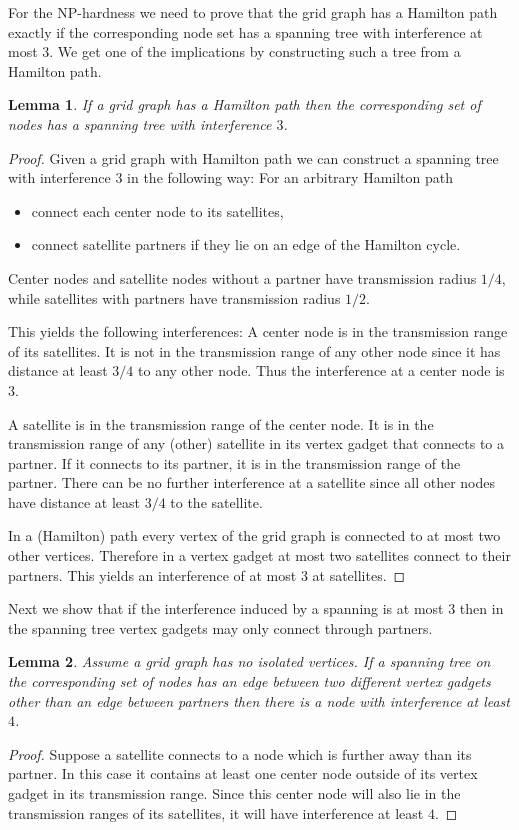 \documentclass{article}
\theoremstyle{plain}
\newtheorem{lem}{Lemma}
\theoremstyle{definition}
\theoremstyle{remark}
\begin{document}
For the NP-hardness we need to prove that the grid graph has a Hamilton path exactly if
the corresponding node set has a spanning tree with interference at most $3$.
We get one of the implications by constructing such a tree from a Hamilton path.

\begin{lem}\label{lem:HPtoST}
If a grid graph has a Hamilton path then the corresponding set of nodes
has a spanning tree with interference $3$.
\end{lem}
\begin{proof}
Given a grid graph with Hamilton path we can construct a spanning tree
with interference $3$ in the following way: For an arbitrary Hamilton path
\begin{itemize}
\item connect each center node to its satellites,
\item connect satellite partners if they lie on an edge of the Hamilton
cycle.
\end{itemize}
Center nodes and satellite nodes without a partner have transmission radius
$1/4$, while satellites with partners have transmission radius $1/2$.

This yields the following interferences:
A center node is in the transmission range of its satellites. It
is not in the transmission range of any other node since it has distance
at least $3/4$ to any other node. Thus the interference at a center node is
$3$.

A satellite is in the transmission range of the center node.
It is in the transmission range of any (other) satellite in its vertex gadget that
connects to a partner. If it connects to its partner, it is in the
transmission range of the partner. There can be no further interference
at a satellite since all other nodes have distance at least $3/4$ to the
satellite.

In a (Hamilton) path every vertex of the
grid graph is connected to at most two other vertices. Therefore in a
vertex gadget at most two satellites connect to their partners. This
yields an interference of at most 3 at satellites.
\end{proof}

Next we show that if the
interference induced by a spanning is at most 3
then in the spanning tree
vertex gadgets may only connect through partners.
 \begin{lem}\label{lem:partners}
Assume a grid graph has no isolated vertices. If a spanning tree on the corresponding set
of nodes has an edge between two different vertex gadgets other than an edge between
partners then there is a node with interference at least $4$.
\end{lem}
\begin{proof}
Suppose a satellite connects to a node which is further away than its partner. In this
case it contains at least one center node outside of its vertex gadget in its
transmission range.
Since this center node will also lie in the transmission ranges of its satellites, it
will have interference at least $4$.
\end{proof}
\end{document}
